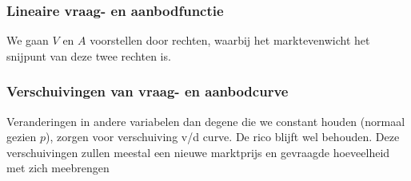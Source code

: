 \subsubsection{Lineaire vraag- en aanbodfunctie}
We gaan $V$ en $A$ voorstellen door rechten, waarbij het marktevenwicht het snijpunt van deze twee rechten is.

\subsubsection{Verschuivingen van vraag- en aanbodcurve}
Veranderingen in andere variabelen dan degene die we constant houden (normaal gezien $p$), zorgen voor verschuiving v/d curve. De rico blijft wel behouden. Deze verschuivingen zullen meestal een nieuwe marktprijs en gevraagde hoeveelheid met zich meebrengen
